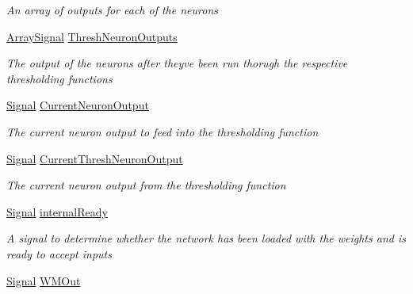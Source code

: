 \begin{DoxyCompactItemize}
\begin{DoxyCompactList}\small\item\em An array of outputs for each of the neurons \end{DoxyCompactList}\item 
\hyperlink{class_n_n_gen_1_1_array_signal}{Array\+Signal} \hyperlink{class_n_n_gen_1_1_sync_neural_network_a6edeb1a10c731dbc74be6e227201deb0}{Thresh\+Neuron\+Outputs}
\begin{DoxyCompactList}\small\item\em The output of the neurons after they\textquotesingle{}ve been run thorugh the respective thresholding functions \end{DoxyCompactList}\item 
\hyperlink{class_n_n_gen_1_1_signal}{Signal} \hyperlink{class_n_n_gen_1_1_sync_neural_network_ac41b8c6d91dd8c38f1bc6800890ed099}{Current\+Neuron\+Output}
\begin{DoxyCompactList}\small\item\em The current neuron output to feed into the thresholding function \end{DoxyCompactList}\item 
\hyperlink{class_n_n_gen_1_1_signal}{Signal} \hyperlink{class_n_n_gen_1_1_sync_neural_network_a79c1844f10a33887abfdae4506524e61}{Current\+Thresh\+Neuron\+Output}
\begin{DoxyCompactList}\small\item\em The current neuron output from the thresholding function \end{DoxyCompactList}\item 
\hyperlink{class_n_n_gen_1_1_signal}{Signal} \hyperlink{class_n_n_gen_1_1_sync_neural_network_ac2ec6cef24b9127af62c98111bc8ce95}{internal\+Ready}
\begin{DoxyCompactList}\small\item\em A signal to determine whether the network has been loaded with the weights and is ready to accept inputs \end{DoxyCompactList}\item 
\hyperlink{class_n_n_gen_1_1_signal}{Signal} \hyperlink{class_n_n_gen_1_1_sync_neural_network_aed787094117713be3ef2eaa612e321e1}{W\+M\+Out}

\end{DoxyCompactItemize}
